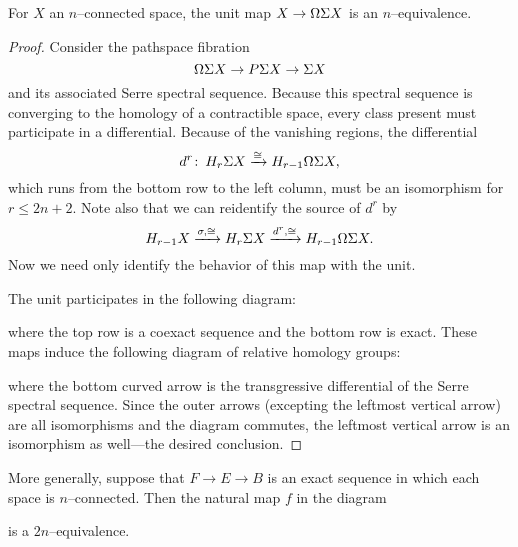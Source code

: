 \begin{theorem}[Freudenthal]\label{FreudenthalRedux}
For $X$ an $n$--connected space, the unit map $X \to \Omega \Sigma X$ is an $n$--equivalence.
\end{theorem}
\begin{proof}
Consider the pathspace fibration \[\Omega \Sigma X \to P \Sigma X \to \Sigma X\] and its associated Serre spectral sequence.
Because this spectral sequence is converging to the homology of a contractible space, every class present must participate in a differential.
Because of the vanishing regions, the differential \[d^r\colon\thinspace H_r \Sigma X \xrightarrow\cong H_{r-1} \Omega \Sigma X,\] which runs from the bottom row to the left column, must be an isomorphism for $r \le 2n+2$.
Note also that we can reidentify the source of $d^r$ by \[H_{r-1} X \xrightarrow{\sigma, \cong} H_r \Sigma X \xrightarrow{d^r, \cong} H_{r-1} \Omega \Sigma X.\]
Now we need only identify the behavior of this map with the unit.

The unit participates in the following diagram:
\begin{center}
\end{center}
where the top row is a coexact sequence and the bottom row is exact.
These maps induce the following diagram of relative homology groups:
\begin{center}
\end{center}
where the bottom curved arrow is the transgressive differential of the Serre spectral sequence.
Since the outer arrows (excepting the leftmost vertical arrow) are all isomorphisms and the diagram commutes, the leftmost vertical arrow is an isomorphism as well---the desired conclusion.
\end{proof}

\begin{remark}\label{ConnectedExactAndCoexactAgree}
More generally, suppose that $F \to E \to B$ is an exact sequence in which each space is $n$--connected.  Then the natural map $f$ in the diagram
\begin{center}
\end{center}
is a $2n$--equivalence.
\end{remark}

